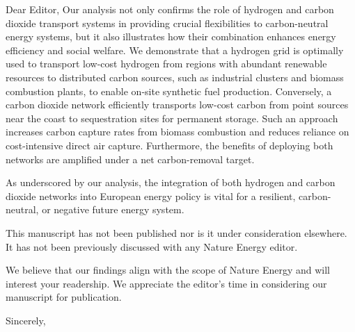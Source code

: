 \documentclass[12pt]{SHUletter}
\begin{document}
\begin{letter}{Dear Editor,}
		Our analysis not only confirms the role of hydrogen and carbon dioxide transport systems in providing crucial flexibilities to carbon-neutral energy systems, but it also illustrates how their combination enhances energy efficiency and social welfare. We demonstrate that a hydrogen grid is optimally used to transport low-cost hydrogen from regions with abundant renewable resources to distributed carbon sources, such as industrial clusters and biomass combustion plants, to enable on-site synthetic fuel production. Conversely, a carbon dioxide network efficiently transports low-cost carbon from point sources near the coast to sequestration sites for permanent storage. Such an approach increases carbon capture rates from biomass combustion and reduces reliance on cost-intensive direct air capture. Furthermore, the benefits of deploying both networks are amplified under a net carbon-removal target.

		As underscored by our analysis, the integration of both hydrogen and carbon dioxide networks into European energy policy is vital for a resilient, carbon-neutral, or negative future energy system.

		This manuscript has not been published nor is it under consideration elsewhere. It has not been previously discussed with any Nature Energy editor.

		We believe that our findings align with the scope of Nature Energy and will interest your readership. We appreciate the editor's time in considering our manuscript for publication.

		\closing{Sincerely,}
	\end{letter}
\end{document}
